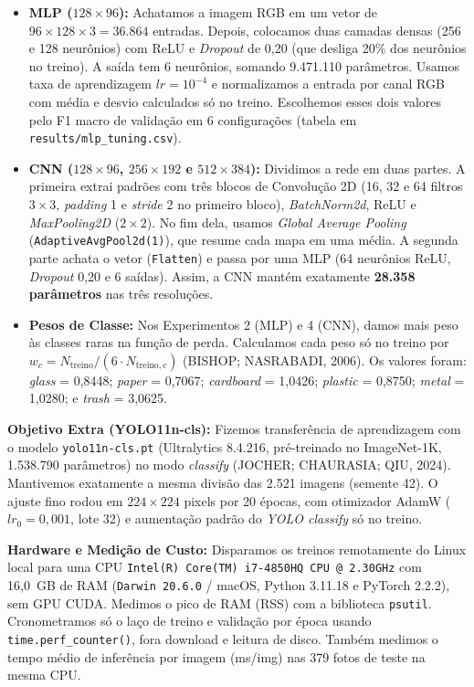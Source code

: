 \documentclass[11pt,a4paper]{article}
\begin{document}
\begin{itemize}
    \item \textbf{MLP ($128 \times 96$):} Achatamos a imagem RGB em um vetor de $96 \times 128 \times 3 = 36.864$ entradas. Depois, colocamos duas camadas densas (256 e 128 neurônios) com ReLU e \textit{Dropout} de 0,20 (que desliga 20\% dos neurônios no treino). A saída tem 6 neurônios, somando 9.471.110 parâmetros. Usamos taxa de aprendizagem $lr = 10^{-4}$ e normalizamos a entrada por canal RGB com média e desvio calculados só no treino. Escolhemos esses dois valores pelo F1 macro de validação em 6 configurações (tabela em \texttt{results/mlp\_tuning.csv}).
    \item \textbf{CNN ($128 \times 96$, $256 \times 192$ e $512 \times 384$):} Dividimos a rede em duas partes. A primeira extrai padrões com três blocos de Convolução 2D (16, 32 e 64 filtros $3\times 3$, \textit{padding} 1 e \textit{stride} 2 no primeiro bloco), \textit{BatchNorm2d}, ReLU e \textit{MaxPooling2D} ($2\times 2$). No fim dela, usamos \textit{Global Average Pooling} (\texttt{AdaptiveAvgPool2d(1)}), que resume cada mapa em uma média. A segunda parte achata o vetor (\texttt{Flatten}) e passa por uma MLP (64 neurônios ReLU, \textit{Dropout} 0,20 e 6 saídas). Assim, a CNN mantém exatamente \textbf{28.358 parâmetros} nas três resoluções.
    \item \textbf{Pesos de Classe:} Nos Experimentos 2 (MLP) e 4 (CNN), damos mais peso às classes raras na função de perda. Calculamos cada peso só no treino por $w_c = N_{\text{treino}} / (6 \cdot N_{\text{treino},c})$ (BISHOP; NASRABADI, 2006). Os valores foram: \textit{glass} = 0,8448; \textit{paper} = 0,7067; \textit{cardboard} = 1,0426; \textit{plastic} = 0,8750; \textit{metal} = 1,0280; e \textit{trash} = 3,0625.
\end{itemize}

\textbf{Objetivo Extra (YOLO11n-cls):} Fizemos transferência de aprendizagem com o modelo \texttt{yolo11n-cls.pt} (Ultralytics 8.4.216, pré-treinado no ImageNet-1K, 1.538.790 parâmetros) no modo \textit{classify} (JOCHER; CHAURASIA; QIU, 2024). Mantivemos exatamente a mesma divisão das 2.521 imagens (semente 42). O ajuste fino rodou em $224 \times 224$ pixels por 20 épocas, com otimizador AdamW ($lr_0 = 0{,}001$, lote 32) e aumentação padrão do \textit{YOLO classify} só no treino.

\textbf{Hardware e Medição de Custo:} Disparamos os treinos remotamente do Linux local para uma CPU \texttt{Intel(R) Core(TM) i7-4850HQ CPU @ 2.30GHz} com 16,0~GB de RAM (\texttt{Darwin 20.6.0} / macOS, Python 3.11.18 e PyTorch 2.2.2), sem GPU CUDA. Medimos o pico de RAM (RSS) com a biblioteca \texttt{psutil}. Cronometramos só o laço de treino e validação por época usando \texttt{time.perf\_counter()}, fora download e leitura de disco. Também medimos o tempo médio de inferência por imagem (ms/img) nas 379 fotos de teste na mesma CPU.
\end{document}
